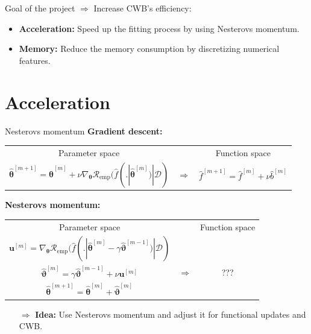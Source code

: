 \documentclass[ignorenonframetext,]{beamer}
\providecommand{\tightlist}{%
  \setlength{\itemsep}{0pt}\setlength{\parskip}{0pt}}
\newcommand{\D}{\mathcal{D}}
\newcommand{\fh}{\hat{f}}
\newcommand{\fmh}{\fh^{[m]}}
\newcommand{\tb}{\bm{\theta}}
\newcommand{\tbh}{\hat{\bm{\theta}}}
\newcommand{\riske}{\mathcal{R}_{\text{emp}}}
\begin{document}
\begin{frame}{Goal of the project}
\protect\hypertarget{goal-of-the-project}{}
\(\Rightarrow\) Increase CWB's efficiency:

\begin{itemize}
\tightlist
\item
  \textbf{Acceleration:} Speed up the fitting process by using Nesterovs
  momentum.
\item
  \textbf{Memory:} Reduce the memory consumption by discretizing
  numerical features.
\end{itemize}
\end{frame}

\hypertarget{acceleration}{%
\section{Acceleration}\label{acceleration}}

\begin{frame}{Nesterovs momentum}
\protect\hypertarget{nesterovs-momentum}{}
\textbf{Gradient descent:}

\vspace{0.2cm}
{\small
\begin{tabular}{ccc}
  Parameter space & & Function space \\[0.3cm]
  $\tbh^{[m+1]} = \tbh^{[m]} + \nu \nabla_{\tb}\riske(\fh(. | \tbh^{[m]}) | \D)$ & $\Rightarrow$ & $\fh^{[m+1]} = \fmh + \nu \hat{b}^{[m]}$
\end{tabular}}
\vspace{0.2cm}

\textbf{Nesterovs momentum:}

\vspace{0.2cm}
{\small
\begin{tabular}{ccc}
  Parameter space & & Function space \\[0.3cm]
  $\bm{u}^{[m]} = \nabla_{\tb}\riske(\fh(. | \tbh^{[m]} - \gamma \hat{\bm{\vartheta}}^{[m-1]}) | \D)$ &  & \\
  $\hat{\bm{\vartheta}}^{[m]} = \gamma \hat{\bm{\vartheta}}^{[m-1]} + \nu \bm{u}^{[m]}$ & $\Rightarrow$ & ??? \\
  $\tbh^{[m+1]} = \tbh^{[m]} + \hat{\bm{\vartheta}}^{[m]}$ & &
\end{tabular}}
\vspace{0.2cm}

\begin{itemize}
\item[$\Rightarrow$] \textbf{Idea:} Use Nesterovs momentum and adjust it for functional updates and CWB.
\end{itemize}
\end{frame}
\end{document}
